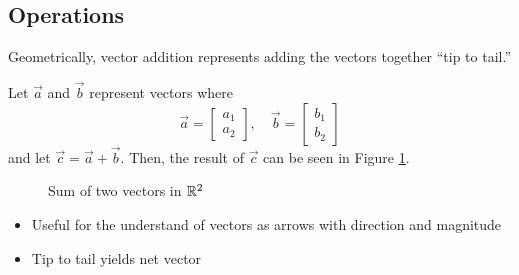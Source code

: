 \documentclass{mlatext}
\begin{document}
\subsection{Operations}
\begin{defn}[Addition]
  Geometrically, vector addition represents adding the vectors together ``tip to tail.''

  Let $\vec{a}$ and $\vec{b}$ represent vectors where
  \begin{equation*}
    \vec{a} = \begin{bmatrix} a_1\\a_2 \end{bmatrix},\quad
    \vec{b} = \begin{bmatrix} b_1\\b_2 \end{bmatrix}
  \end{equation*}
  and let $\vec{c} = \vec{a} + \vec{b}$. Then, the result of $\vec{c}$ can be seen in Figure \ref{fig:vec_sum}.\\
\end{defn}
\begin{figure}[h]
  \centering
  \caption{Sum of two vectors in $\mathbb{R}^2$}
  \label{fig:vec_sum}
\end{figure}
\begin{itemize}
\item Useful for the understand of vectors as arrows with direction and magnitude
\item Tip to tail yields net vector
\end{itemize}
\end{document}
